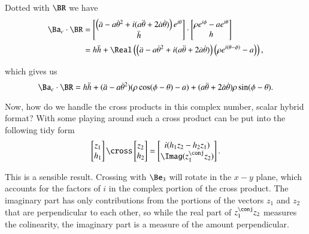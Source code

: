 {Dotted with \(\BR\) we have
%
\begin{equation}\label{eqn:relativisticElectrodynamicsExamReflection:1290}
\begin{aligned}
\Ba_c \cdot \BR
&=
\begin{bmatrix}
\left( \ddot{a} - a {\dot{\theta}}^2 + i ( a\ddot{\theta} + 2 \dot{a} \dot{\theta} ) \right) e^{i\theta} \\
\ddot{h}
\end{bmatrix}
\cdot
\begin{bmatrix}
\rho e^{i\phi} - a e^{i\theta} \\
h
\end{bmatrix} \\
&=
h \ddot{h} + \Real\left(
\left( \ddot{a} - a {\dot{\theta}}^2 + i ( a\ddot{\theta} + 2 \dot{a} \dot{\theta} ) \right) \left(\rho e^{i(\theta- \phi)} - a\right)
\right) ,
\end{aligned}
\end{equation}

which gives us
%
\begin{equation}\label{eqn:relativisticElectrodynamicsExamReflection:950}
\Ba_c \cdot \BR =
h \ddot{h} +
( \ddot{a} - a {\dot{\theta}}^2 ) (\rho \cos(\phi - \theta) - a)
+ (a \ddot{\theta} + 2 \dot{a} \dot{\theta}) \rho \sin(\phi - \theta).
\end{equation}

Now, how do we handle the cross products in this complex number, scalar hybrid format?  With some playing around such a cross product can be put into the following tidy form
%
\begin{equation}\label{eqn:relativisticElectrodynamicsExamReflection:960}
\begin{bmatrix}
z_1 \\
h_1
\end{bmatrix}
\cross
\begin{bmatrix}
z_2 \\
h_2
\end{bmatrix}
=
\begin{bmatrix}
i (h_1 z_2 - h_2 z_1) \\
\Imag(z_1^\conj z_2)
\end{bmatrix}.
\end{equation}

This is a sensible result.  Crossing with \(\Be_3\) will rotate in the \(x-y\) plane, which accounts for the factors of \(i\) in the complex portion of the cross product.  The imaginary part has only contributions from the portions of the vectors \(z_1\) and \(z_2\) that are perpendicular to each other, so while the real part of \(z_1^\conj z_2\) measures the colinearity, the imaginary part is a measure of the amount perpendicular.

}
